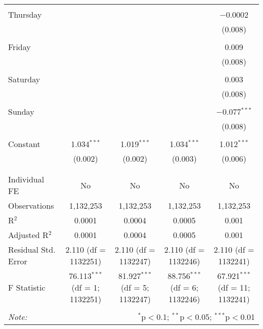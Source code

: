 \documentclass[
]{article}
\begin{document}
\begin{table}[!htbp]
{\begin{tabular}{@{\extracolsep{5pt}}lcccc}
  & & & & \\ 
 Thursday &  &  &  & $-$0.0002 \\ 
  &  &  &  & (0.008) \\ 
  & & & & \\ 
 Friday &  &  &  & 0.009 \\ 
  &  &  &  & (0.008) \\ 
  & & & & \\ 
 Saturday &  &  &  & 0.003 \\ 
  &  &  &  & (0.008) \\ 
  & & & & \\ 
 Sunday &  &  &  & $-$0.077$^{***}$ \\ 
  &  &  &  & (0.008) \\ 
  & & & & \\ 
 Constant & 1.034$^{***}$ & 1.019$^{***}$ & 1.034$^{***}$ & 1.012$^{***}$ \\ 
  & (0.002) & (0.002) & (0.003) & (0.006) \\ 
  & & & & \\ 
\hline \\[-1.8ex] 
Individual FE & No & No & No & No \\ 
Observations & 1,132,253 & 1,132,253 & 1,132,253 & 1,132,253 \\ 
R$^{2}$ & 0.0001 & 0.0004 & 0.0005 & 0.001 \\ 
Adjusted R$^{2}$ & 0.0001 & 0.0004 & 0.0005 & 0.001 \\ 
Residual Std. Error & 2.110 (df = 1132251) & 2.110 (df = 1132247) & 2.110 (df = 1132246) & 2.110 (df = 1132241) \\ 
F Statistic & 76.113$^{***}$ (df = 1; 1132251) & 81.927$^{***}$ (df = 5; 1132247) & 88.756$^{***}$ (df = 6; 1132246) & 67.921$^{***}$ (df = 11; 1132241) \\ 
\hline 
\hline \\[-1.8ex] 
\textit{Note:}  & \multicolumn{4}{r}{$^{*}$p$<$0.1; $^{**}$p$<$0.05; $^{***}$p$<$0.01} \\ 
\end{tabular}
} 
\end{table} 
\newpage
\end{document}
